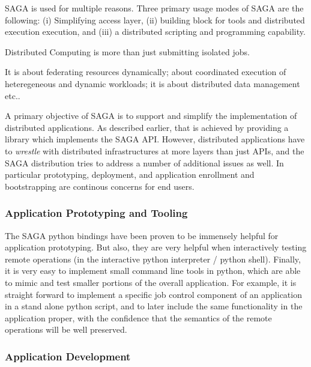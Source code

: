 \documentclass[12pt]{article}
\begin{document}
SAGA is used for multiple reasons. Three primary usage modes of SAGA
are the following: (i) Simplifying access layer, (ii) building block
for tools and distributed execution execution, and (iii) a distributed
scripting and programming capability.

Distributed Computing is more than just submitting isolated jobs.

It is about federating resources dynamically; about coordinated
execution of heteregeneous and dynamic workloads; it is about
distributed data management etc..


A primary objective of SAGA is to support and simplify the
implementation of distributed applications.  As described earlier,
that is achieved by providing a library which implements the SAGA API.
However, distributed applications have to {\it wrestle} with
distributed infrastructures at more layers than just APIs, and the
SAGA distribution tries to address a number of additional issues as
well. In particular prototyping, deployment, and application
enrollment and bootstrapping are continous concerns for end users.

  \subsubsection*{Application Prototyping and Tooling}

   The SAGA python bindings have been proven to be immensely helpful
   for application prototyping.  But also, they are very helpful when
   interactively testing remote operations (in the interactive python
   interpreter / python shell).  Finally, it is very easy to implement
   small command line tools in python, which are able to mimic and
   test smaller portions of the overall application.  For example, it
   is straight forward to implement a specific job control component
   of an application in a stand alone python script, and to later
   include the same functionality in the application proper, with the
   confidence that the semantics of the remote operations will be well
   preserved. %


  \subsubsection*{Application Development}

\end{document}
